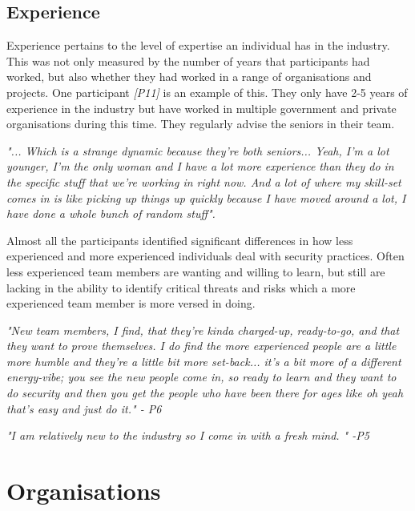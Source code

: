 \subsection{Experience}

\par Experience pertains to the level of expertise an individual has in the industry. This was not only measured by the number of years that participants had worked, but also whether they had worked in a range of organisations and projects. One participant \textit{[P11]} is an example of this. They only have 2-5 years of experience in the industry but have worked in multiple government and private organisations during this time. They regularly advise the seniors in their team.
\newline
\par
\textit{"... Which is a strange dynamic because they're both seniors... Yeah, I'm a lot younger, I'm the only woman and I have a lot more experience than they do in the specific stuff that we're working in right now. And a lot of where my skill-set comes in is like picking up things up quickly because I have moved around a lot, I have done a whole bunch of random stuff".}
\newline
\par
Almost all the participants identified significant differences in how less experienced and more experienced individuals deal with security practices. Often less experienced team members are wanting and willing to learn, but still are lacking in the ability to identify critical threats and risks which a more experienced team member is more versed in doing. 
\newline
\par
\textit{"New team members, I find, that they're kinda charged-up, ready-to-go, and that they want to prove themselves. I do find the more experienced people are a little more humble and they're a little bit more set-back... it's a bit more of a  different energy-vibe; you see the new people come in, so ready to learn and they want to do security and then you get the people who have been there for ages like oh yeah that's easy and just do it." - P6 }
\newline
\par
\textit{"I am relatively new to the industry so I come in with a fresh mind. " -P5}

\section{Organisations}

